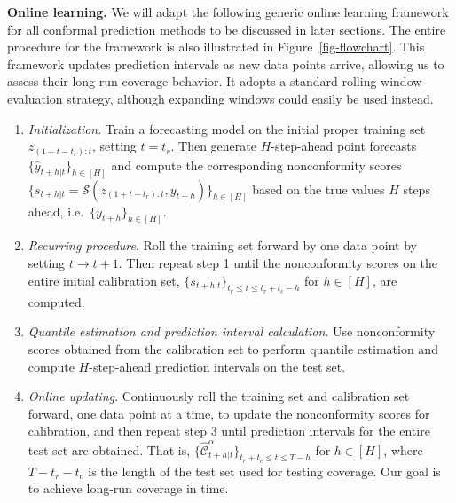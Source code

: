 \documentclass[
  11pt,
  a4paper,
]{article}
\theoremstyle{plain}
\theoremstyle{remark}
\begin{document}
\textbf{Online learning.} We will adapt the following generic online
learning framework for all conformal prediction methods to be discussed
in later sections. The entire procedure for the framework is also
illustrated in Figure~\ref{fig-flowchart}. This framework updates
prediction intervals as new data points arrive, allowing us to assess
their long-run coverage behavior. It adopts a standard rolling window
evaluation strategy, although expanding windows could easily be used
instead.

\begin{enumerate}
\def\labelenumi{\arabic{enumi}.}
\item
  \emph{Initialization}. Train a forecasting model on the initial proper
  training set \(z_{(1+t-t_r):t}\), setting \(t=t_r\). Then generate
  \(H\)-step-ahead point forecasts \(\{\hat{y}_{t+h|t}\}_{h\in[H]}\) and
  compute the corresponding nonconformity scores
  \(\{s_{t+h|t}=\mathcal{S}(z_{(1+t-t_r):t}, y_{t+h})\}_{h\in[H]}\)
  based on the true values \(H\) steps ahead,
  i.e.~\(\{y_{t+h}\}_{h\in[H]}\).
\item
  \emph{Recurring procedure}. Roll the training set forward by one data
  point by setting \(t \rightarrow t+1\). Then repeat step 1 until the
  nonconformity scores on the entire initial calibration set,
  \(\{s_{t+h|t}\}_{t_r \leq t \leq t_r+t_c-h}\) for \(h\in[H]\), are
  computed.
\item
  \emph{Quantile estimation and prediction interval calculation}. Use
  nonconformity scores obtained from the calibration set to perform
  quantile estimation and compute \(H\)-step-ahead prediction intervals
  on the test set.
\item
  \emph{Online updating}. Continuously roll the training set and
  calibration set forward, one data point at a time, to update the
  nonconformity scores for calibration, and then repeat step 3 until
  prediction intervals for the entire test set are obtained. That is,
  \(\{\hat{\mathcal{C}}_{t+h|t}^{\alpha}\}_{t_r+t_c \leq t \leq T-h}\)
  for \(h \in [H]\), where \(T-t_r-t_c\) is the length of the test set
  used for testing coverage. Our goal is to achieve long-run coverage in
  time.
\end{enumerate}
\end{document}
